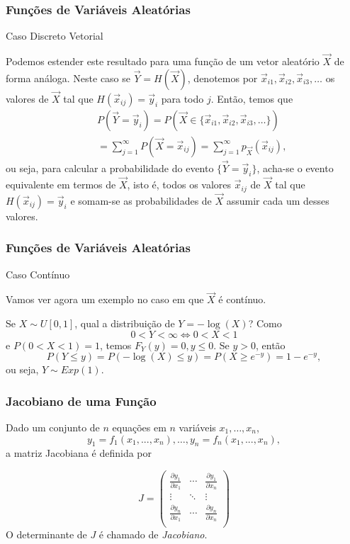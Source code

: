 \begin{frame}
\frametitle{\textbf{Funções de Variáveis Aleatórias}}
\baselineskip=13pt
\begin{block}{Caso Discreto Vetorial}


Podemos estender este resultado para uma função de um vetor
aleatório $\vec{X}$ de forma análoga. Neste caso se $\vec{Y}=H(\vec{X})$,
denotemos por $\vec{x}_{i1},\vec{x}_{i2},\vec{x}_{i3},\ldots$ os
valores de $\vec{X}$ tal que $H(\vec{x}_{ij})=\vec{y}_i$ para todo $j$.
Então, temos que
\begin{eqnarray}
& & P(\vec{Y}=\vec{y}_i)=P(\vec{X}\in\{\vec{x}_{i1},\vec{x}_{i2},\vec{x}_{i3},\ldots\})\nonumber \\ & & =\sum_{j=1}^{\infty}P(\vec{X}=\vec{x}_{ij})=\sum_{j=1}^{\infty}p_{\vec{X}}(\vec{x}_{ij}),\nonumber
\end{eqnarray}
ou seja, para calcular a probabilidade do evento $\{\vec{Y}=\vec{y}_i\}$,
acha-se o evento equivalente em termos de $\vec{X}$, isto é, todos
os valores $\vec{x}_{ij}$ de $\vec{X}$ tal que $H(\vec{x}_{ij})=\vec{y}_i$
e somam-se as probabilidades de $\vec{X}$ assumir cada um desses
valores.

\end{block}
\end{frame}

\begin{frame}
\frametitle{\textbf{Funções de Variáveis Aleatórias}}
\baselineskip=13pt
\begin{block}{Caso Contínuo}


Vamos ver agora um exemplo no caso em que $\vec{X}$ é contínuo.

\begin{exem}
Se $X\sim U[0,1]$, qual a distribuição de $Y=-\log(X)$? Como
$$0<Y<\infty\Leftrightarrow 0<X<1$$
e $P(0<X<1)=1$, temos $F_Y(y)=0,y\leq 0$. Se $y>0$, então
$$P(Y\leq y)=P(-\log(X)\leq y)=P(X\geq e^{-y})=1-e^{-y},$$
ou seja, $Y\sim Exp(1)$.
\end{exem}

\end{block}
\end{frame}

\begin{frame}
\frametitle{\textbf{Jacobiano de uma Função}}
\baselineskip=13pt
\begin{block}{}

Dado um conjunto de $n$ equações em $n$ variáveis $x_1, \ldots, x_n$,
$$y_1=f_1(x_1,...,x_n),\ldots, y_n=f_n(x_1,...,x_n),$$	
a matriz Jacobiana é definida por

$$
J=\left(
\begin{array}{ccc}
\frac{\partial y_1}{\partial x_1} & \cdots & \frac{\partial y_1}{\partial x_n} \\
\vdots & \ddots & \vdots \\
\frac{\partial y_n}{\partial x_1} & \cdots & \frac{\partial y_n}{\partial x_n} \\
\end{array}
\right)
$$
O determinante de $J$ é chamado de {\em Jacobiano}.
\end{block}
\end{frame}

